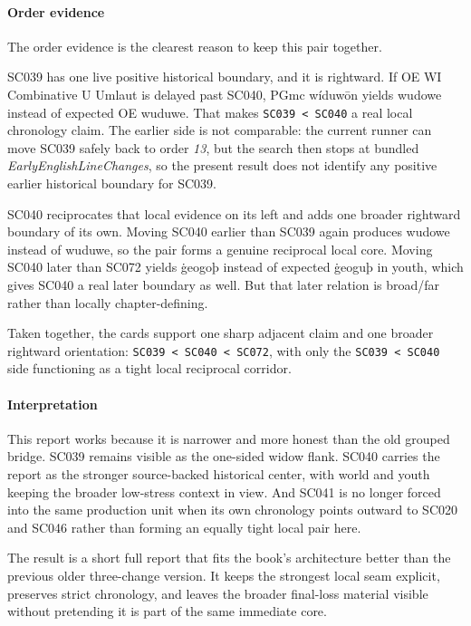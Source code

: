 \documentclass[
  british,
  a4paper,
]{article}
\begin{document}
\paragraph{Order evidence}\label{order-evidence-24}

The order evidence is the clearest reason to keep this pair together.

SC039 has one live positive historical boundary, and it is rightward. If
OE WI Combinative U Umlaut is delayed past SC040, PGmc wíduwōn yields
wudowe instead of expected OE wuduwe. That makes
\texttt{SC039\ \textless{}\ SC040} a real local chronology claim. The
earlier side is not comparable: the current runner can move SC039 safely
back to order \emph{13}, but the search then stops at bundled
\emph{EarlyEnglishLineChanges}, so the present result does not identify
any positive earlier historical boundary for SC039.

SC040 reciprocates that local evidence on its left and adds one broader
rightward boundary of its own. Moving SC040 earlier than SC039 again
produces wudowe instead of wuduwe, so the pair forms a genuine
reciprocal local core. Moving SC040 later than SC072 yields ġeogoþ
instead of expected ġeoguþ in youth, which gives SC040 a real later
boundary as well. But that later relation is broad/far rather than
locally chapter-defining.

Taken together, the cards support one sharp adjacent claim and one
broader rightward orientation:
\texttt{SC039\ \textless{}\ SC040\ \textless{}\ SC072}, with only the
\texttt{SC039\ \textless{}\ SC040} side functioning as a tight local
reciprocal corridor.

\paragraph{Interpretation}\label{interpretation-24}

This report works because it is narrower and more honest than the old
grouped bridge. SC039 remains visible as the one-sided widow flank.
SC040 carries the report as the stronger source-backed historical
center, with world and youth keeping the broader low-stress context in
view. And SC041 is no longer forced into the same production unit when
its own chronology points outward to SC020 and SC046 rather than forming
an equally tight local pair here.

The result is a short full report that fits the book's architecture
better than the previous older three-change version. It keeps the
strongest local seam explicit, preserves strict chronology, and leaves
the broader final-loss material visible without pretending it is part of
the same immediate core.
\end{document}
